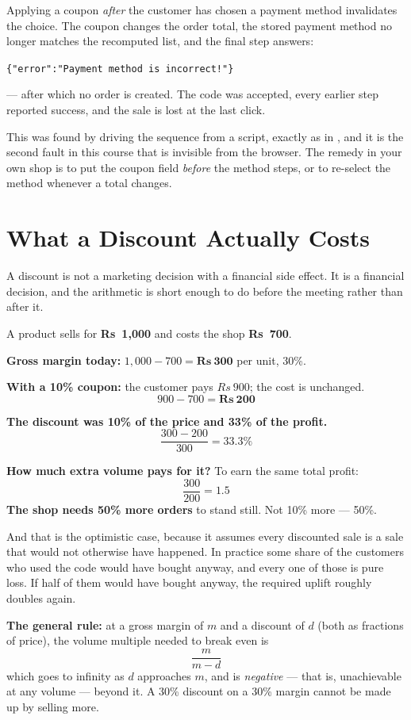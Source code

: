 \begin{alertbox}
Applying a coupon \emph{after} the customer has chosen a payment method
invalidates the choice. The coupon changes the order total, the stored payment
method no longer matches the recomputed list, and the final step answers:

\smallskip
\hspace*{1em}\texttt{\{"error":"Payment method is incorrect!"\}}

\smallskip
--- after which no order is created. The code was accepted, every earlier step
reported success, and the sale is lost at the last click.

\smallskip
This was found by driving the sequence from a script, exactly as in
, and it is the second fault in this course that is invisible
from the browser. The remedy in your own shop is to put the coupon field
\emph{before} the method steps, or to re-select the method whenever a total
changes.
\end{alertbox}

\section{What a Discount Actually Costs}

A discount is not a marketing decision with a financial side effect. It is a
financial decision, and the arithmetic is short enough to do before the
meeting rather than after it.

\begin{worked}
A product sells for \textbf{Rs~1{,}000} and costs the shop \textbf{Rs~700}.

\smallskip
\textbf{Gross margin today:} $1{,}000 - 700 = \mathbf{Rs~300}$ per unit, 30\%.

\smallskip
\textbf{With a 10\% coupon:} the customer pays $Rs~900$; the cost is unchanged.
\[ 900 - 700 = \mathbf{Rs~200} \]

\smallskip
\textbf{The discount was 10\% of the price and 33\% of the profit.}
\[ \frac{300 - 200}{300} = 33.3\% \]

\smallskip
\textbf{How much extra volume pays for it?} To earn the same total profit:
\[ \frac{300}{200} = 1.5 \]
\textbf{The shop needs 50\% more orders} to stand still. Not 10\% more --- 50\%.

\smallskip
And that is the optimistic case, because it assumes every discounted sale is a
sale that would not otherwise have happened. In practice some share of the
customers who used the code would have bought anyway, and every one of those is
pure loss. If half of them would have bought anyway, the required uplift roughly
doubles again.

\smallskip
\textbf{The general rule:} at a gross margin of $m$ and a discount of $d$ (both
as fractions of price), the volume multiple needed to break even is
\[ \frac{m}{m - d} \]
which goes to infinity as $d$ approaches $m$, and is \emph{negative} --- that
is, unachievable at any volume --- beyond it. A 30\% discount on a 30\% margin
cannot be made up by selling more.
\end{worked}

